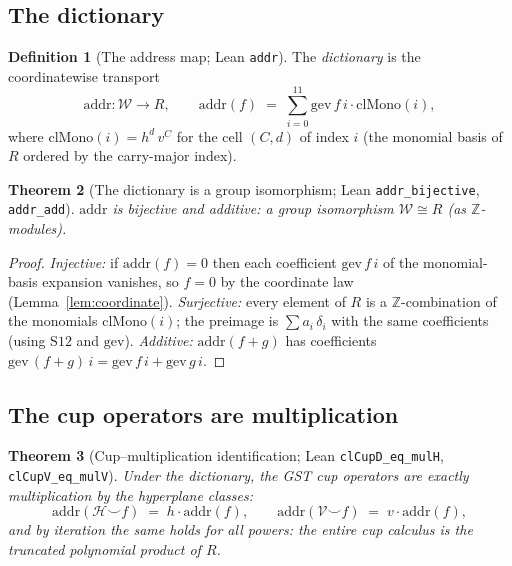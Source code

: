 \documentclass[11pt,a4paper]{article}
\theoremstyle{plain}
\newtheorem{theorem}{Theorem}[section]
\theoremstyle{definition}
\newtheorem{definition}[theorem]{Definition}
\newcommand{\Z}{\mathbb{Z}}
\newcommand{\HC}{\mathcal{H}}
\newcommand{\VV}{\mathcal{V}}
\newcommand{\cupop}{\smile}
\begin{document}
\subsection{The dictionary}

\begin{definition}[The address map; Lean \texttt{addr}]\label{def:addr}
The \emph{dictionary} is the coordinatewise transport
\[
  \mathrm{addr}\colon \mathcal{W} \longrightarrow R, \qquad
  \mathrm{addr}(f) \;=\; \sum_{i=0}^{11} \mathrm{gev}\,f\,i\cdot
    \mathrm{clMono}(i),
\]
where $\mathrm{clMono}(i) = h^{d}\,v^{C}$ for the cell $(C,d)$ of index $i$
(the monomial basis of $R$ ordered by the carry-major index).
\end{definition}

\begin{theorem}[The dictionary is a group isomorphism; Lean
\texttt{addr\_bijective}, \texttt{addr\_add}]\label{thm:addr}
$\mathrm{addr}$ is bijective and additive: a group isomorphism
$\mathcal{W} \cong R$ (as $\Z$-modules).
\end{theorem}

\begin{proof}
\emph{Injective:} if $\mathrm{addr}(f) = 0$ then each coefficient
$\mathrm{gev}\,f\,i$ of the monomial-basis expansion vanishes, so $f = 0$ by
the coordinate law (Lemma~\ref{lem:coordinate}).
\emph{Surjective:} every element of $R$ is a $\Z$-combination of the
monomials $\mathrm{clMono}(i)$; the preimage is
$\sum a_i\,\delta_i$ with the same coefficients (using $\mathrm{S12}$ and
$\mathrm{gev}$).
\emph{Additive:} $\mathrm{addr}(f+g)$ has coefficients
$\mathrm{gev}\,(f+g)\,i = \mathrm{gev}\,f\,i + \mathrm{gev}\,g\,i$.
\end{proof}

\subsection{The cup operators are multiplication}

\begin{theorem}[Cup--multiplication identification; Lean
\texttt{clCupD\_eq\_mulH}, \texttt{clCupV\_eq\_mulV}]
\label{thm:cupmul}
Under the dictionary, the GST cup operators are exactly multiplication by
the hyperplane classes:
\[
  \mathrm{addr}(\HC \cupop f) \;=\; h \cdot \mathrm{addr}(f),
  \qquad
  \mathrm{addr}(\VV \cupop f) \;=\; v \cdot \mathrm{addr}(f),
\]
and by iteration the same holds for all powers: the entire cup calculus is
the truncated polynomial product of $R$.
\end{theorem}
\end{document}
